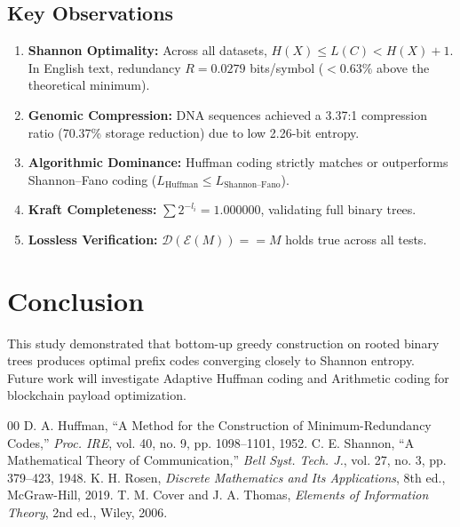 \documentclass[conference]{IEEEtran}
\begin{document}
\subsection{Key Observations}
\begin{enumerate}
    \item \textbf{Shannon Optimality:} Across all datasets, $H(X) \le L(C) < H(X) + 1$. In English text, redundancy $R = 0.0279$ bits/symbol ($< 0.63\%$ above the theoretical minimum).
    \item \textbf{Genomic Compression:} DNA sequences achieved a 3.37:1 compression ratio (70.37\% storage reduction) due to low 2.26-bit entropy.
    \item \textbf{Algorithmic Dominance:} Huffman coding strictly matches or outperforms Shannon--Fano coding ($L_{\text{Huffman}} \le L_{\text{Shannon--Fano}}$).
    \item \textbf{Kraft Completeness:} $\sum 2^{-l_i} = 1.000000$, validating full binary trees.
    \item \textbf{Lossless Verification:} $\mathcal{D}(\mathcal{E}(M)) == M$ holds true across all tests.
\end{enumerate}

\section{Conclusion}
This study demonstrated that bottom-up greedy construction on rooted binary trees produces optimal prefix codes converging closely to Shannon entropy. Future work will investigate Adaptive Huffman coding and Arithmetic coding for blockchain payload optimization.

\begin{thebibliography}{00}
 D. A. Huffman, ``A Method for the Construction of Minimum-Redundancy Codes,'' \textit{Proc. IRE}, vol. 40, no. 9, pp. 1098--1101, 1952.
 C. E. Shannon, ``A Mathematical Theory of Communication,'' \textit{Bell Syst. Tech. J.}, vol. 27, no. 3, pp. 379--423, 1948.
 K. H. Rosen, \textit{Discrete Mathematics and Its Applications}, 8th ed., McGraw-Hill, 2019.
 T. M. Cover and J. A. Thomas, \textit{Elements of Information Theory}, 2nd ed., Wiley, 2006.
\end{thebibliography}
\end{document}
